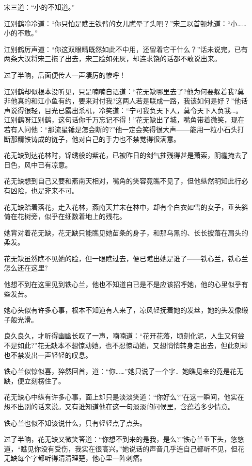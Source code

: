 \documentclass[12pt,oneside]{book}
\begin{document}
宋三道：``小的不知道。''

江别鹤冷冷道：``你只怕是瞧王铁臂的女儿瞧晕了头吧？''宋三以首顿地道：``小\ldots\ldots 小的不敢。''

江别鹤厉声道：``你这双眼睛既然如此不中用，还留着它干什么？''话未说完，已有两条大汉将宋三拖了出去，宋三脸如死灰，却连求饶的话都不敢说出来。

过了半晌，后面便传人一声凄厉的惨呼！

江别鹤却似根本没听见，只是喃喃自语道：``花无缺哪里去了?他为何要躲着我?莫非他真的和江小鱼有约，要来对付我?这两人若是联成一路，我该如何是好？''他话声说得很轻，目光已露出杀机，冷笑道：``宁可我负天下人，莫令天下人负我\ldots。江别鹤呀江别鹤，这句话你千万忘记不得！''花无缺出了城，嘴角带着微笑，现在若有人问他：``那流星锤是怎会断的?''他一定会笑得很大声------能用一粒小石头打断那精铁铸成的链子，他对自己的手力也不禁觉得很满意。

花无缺到达花林时，锦绣般的紫花，已被昨日的剑气摧残得甚是萧索，阴霾掩去了日色，风中已有凉意。

花无缺想到自己又要和燕南天相对，嘴角的笑容竟瞧不见了，但他纵然明知此行必有凶险，也是非来不可。

花无缺踏着落花，走入花林，燕南天并末在林中，却有个白衣如雪的女子，垂头斜倚在花树旁，似乎在细数着地上的残花。

她背对着花无缺，花无缺只能瞧见她苗条的身子，和那乌黑的、长长披落在肩头的柔发。

花无缺虽然瞧不见她的脸，但一眼瞧过去，便已瞧出她是谁了------铁心兰，铁心兰怎么还在这里?

他想不到在这里见到铁心兰，他也不知道自已是不是应该招呼她，他的心里似乎有些发苦。

她心头似有许多心事，根本不知道有人来了，凉风轻抚着她的发丝，她的头发像缎子般光滑。

良久良久，才听得幽幽长叹了一声，喃喃道：``花开花落，顷刻化泥，人生又何尝不是如此?''花无缺本不想惊动她，也不忍惊动她，又想悄悄转身走出去，但此刻却也不禁发出一声轻轻的叹息。

铁心兰似惊似喜，猝然回首，道：``你\ldots\ldots{}''她只说了一个字．她瞧见来的竟是花无缺，便立刻楞住了。

花无缺心中纵有许多心事，面上却只是淡淡笑道：``你好么?''在这一瞬间，他实在想不出别的话来说。又有谁知道他在这一句淡淡的问候里，含蕴着多少情意。

铁心兰也似不知该说什么，只有轻轻点了点头。

过了半晌，花无缺又微笑答道：``你想不到来的是我，是么?''铁心兰垂下头，悠悠道，``瞧见你没有受伤，我实在很高兴。''她说话的声音几乎连自己都听不见，但花无缺每个字都听得清清理楚，他心里一阵刺痛。
\end{document}
